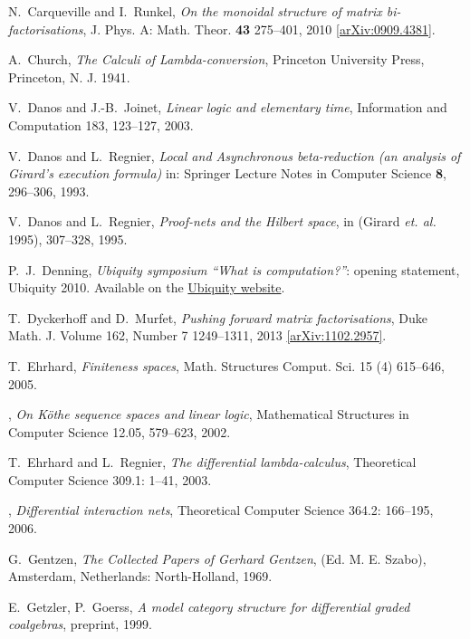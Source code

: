 \documentclass[english,letter paper,12pt,reqno]{article}
\theoremstyle{example}
\numberwithin{equation}{section}
\begin{document}
\begin{thebibliography}{BHLS03}
N.~Carqueville and I.~Runkel, \textsl{On the monoidal structure of matrix bi-factorisations}, J. Phys.
  A: Math. Theor. \textbf{43} 275--401, 2010
  \href{http://arxiv.org/abs/0909.4381}{[arXiv:0909.4381]}.

A.~Church, \textsl{The {C}alculi of {L}ambda-conversion}, Princeton University Press, Princeton, N. J. 1941.

V.~Danos and J.-B.~Joinet, \textsl{Linear logic and elementary time}, Information and Computation 183, 123--127, 2003.

V.~Danos and L.~Regnier, \textsl{Local and {A}synchronous beta-reduction (an analysis of {G}irard's execution formula)} in: Springer Lecture Notes in Computer Science \textbf{8}, 296--306, 1993.

V.~Danos and L.~Regnier, \textsl{Proof-nets and the Hilbert space}, in (Girard \textsl{et. al.} 1995), 307--328, 1995.

P.~J.~Denning, \textsl{Ubiquity symposium ``What is computation?''}: opening statement, Ubiquity 2010. Available on the \href{http://ubiquity.acm.org/article.cfm?id=1870596}{Ubiquity website}.

T.~Dyckerhoff and D.~Murfet, \textsl{Pushing forward matrix factorisations}, Duke Math. J. Volume 162, Number 7 1249--1311, 2013 \href{http://arxiv.org/abs/1102.2957}{[arXiv:1102.2957]}.

T.~Ehrhard, \textsl{Finiteness spaces}, Math. Structures Comput. Sci. 15 (4) 615--646, 2005.

\bysame, \textsl{On {K}\"othe sequence spaces and linear logic}, Mathematical Structures in Computer Science 12.05, 579--623, 2002.

T.~Ehrhard and L.~Regnier, \textsl{The differential lambda-calculus}, Theoretical Computer Science 309.1: 1--41, 2003.

\bysame, \textsl{Differential interaction nets}, Theoretical Computer Science 364.2: 166--195, 2006.

G.~Gentzen, \textsl{The Collected Papers of Gerhard Gentzen}, (Ed. M. E. Szabo), Amsterdam, Netherlands: North-Holland, 1969.

E.~Getzler, P.~Goerss, \emph{A model category structure for differential graded coalgebras}, preprint, 1999.
  

\end{thebibliography}
\end{document}
